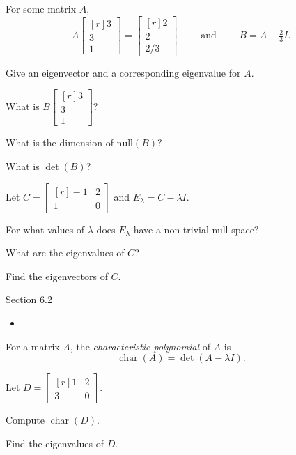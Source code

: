 \documentclass{problemset}
\DeclareMathOperator{\chr}{char}
\newcommand{\mat}[1]{\begin{bmatrix*}[r]#1\end{bmatrix*}}
\begin{document}
	\question
	For some matrix $A$,
	\vspace{-.2cm}
	\[
		A\mat{3\\3\\1}=\mat{2\\2\\2/3}\qquad\text{ and }\qquad B=A-\tfrac{2}{3}I.
	\]
	\vspace{-.4cm}
	\begin{parts}
		\item Give an eigenvector and a corresponding eigenvalue for $A$.
		\item What is $B\mat{3\\3\\1}$?
		\item What is the dimension of $\text{null}(B)$?
		\item What is $\det(B)$?
	\end{parts}

	\vspace{-.2cm}
	\question
	Let $C=\mat{-1&2\\1&0}$ and $E_\lambda = C-\lambda I$.
	\begin{parts}
		\item For what values of $\lambda$ does $E_\lambda$ have a non-trivial
			null space?
		\item What are the eigenvalues of $C$?
		\item Find the eigenvectors of $C$.
	\end{parts}
	
\begin{lesson}
	\newpage

	Section 6.2

	\begin{itemize}
		\item 
	\end{itemize}


	\newpage
\end{lesson}
	\begin{definition}
	For a matrix $A$, the \emph{characteristic polynomial} of $A$ is
	\[
		\chr(A)=\det(A-\lambda I).
	\]
	\end{definition}
	\vspace{-.4cm}
	
	\question
	Let $D=\mat{1&2\\3&0}$.
	\begin{parts}
		\item Compute $\chr(D)$.
		\item Find the eigenvalues of $D$.
	\end{parts}
\end{document}
